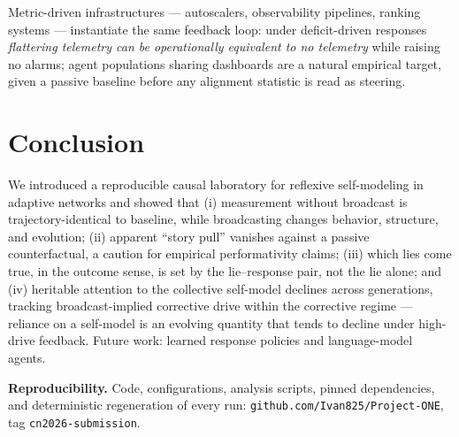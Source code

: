 \documentclass{svproc}
\begin{document}
Metric-driven infrastructures --- autoscalers, observability pipelines,
ranking systems \cite{espeland2007rankings} --- instantiate the same
feedback loop: under
deficit-driven responses \emph{flattering telemetry can be operationally
equivalent to no telemetry} while raising no alarms; agent populations sharing
dashboards \cite{park2023generative} are a natural empirical target, given a
passive baseline before any alignment statistic is read as steering.

\section{Conclusion}
We introduced a reproducible causal laboratory for reflexive self-modeling in
adaptive networks and showed that (i) measurement without broadcast is
trajectory-identical to baseline, while broadcasting changes behavior,
structure, and evolution; (ii) apparent ``story pull'' vanishes against a
passive counterfactual, a caution for empirical performativity claims;
(iii) which lies come true, in the outcome sense, is set by the lie--response
pair, not the lie alone; and (iv) heritable attention to the collective
self-model declines across generations, tracking broadcast-implied corrective
drive within the corrective regime --- reliance on a self-model is an evolving
quantity that tends to decline under high-drive feedback. Future work: learned response policies and
language-model agents.

\smallskip
\noindent\textbf{Reproducibility.} Code, configurations, analysis scripts,
pinned dependencies, and deterministic regeneration of every run:
\texttt{github.com/Ivan825/Project-ONE}, tag \texttt{cn2026-submission}.
\end{document}
